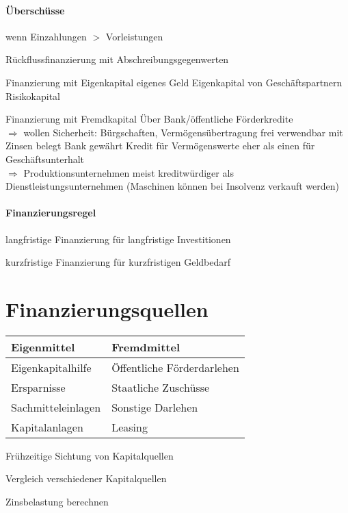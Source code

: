 \paragraph{Überschüsse}
wenn Einzahlungen $>$ Vorleistungen

\begin{compactitem}
	\item Rückflussfinanzierung
	\subitem mit Abschreibungsgegenwerten
	\item Finanzierung mit Eigenkapital
	\subitem eigenes Geld
	\subitem Eigenkapital von Geschäftspartnern
	\subitem Risikokapital
	\item Finanzierung mit Fremdkapital
	\subitem Über Bank/öffentliche Förderkredite\\
	$\Rightarrow$ wollen Sicherheit: Bürgschaften, Vermögensübertragung
	\subitem frei verwendbar
	\subitem mit Zinsen belegt
	\subitem Bank gewährt Kredit für Vermögenswerte eher als einen für Geschäftsunterhalt\\
	$\Rightarrow$ Produktionsunternehmen meist kreditwürdiger als Dienstleistungsunternehmen (Maschinen können bei Insolvenz verkauft werden)
\end{compactitem}

\paragraph{Finanzierungsregel}
\begin{compactitem}
	\item langfristige Finanzierung für langfristige Investitionen
	\item kurzfristige Finanzierung für kurzfristigen Geldbedarf
\end{compactitem}

\clearpage
\section{Finanzierungsquellen}
\begin{tabular}{l|l}
	{\bf Eigenmittel} & {\bf Fremdmittel}\\\hline
	Eigenkapitalhilfe & Öffentliche Förderdarlehen\\
	Ersparnisse & Staatliche Zuschüsse\\
	Sachmitteleinlagen & Sonstige Darlehen\\
	Kapitalanlagen & Leasing\\
\end{tabular}
\begin{compactitem}
	\item Frühzeitige Sichtung von Kapitalquellen
	\item Vergleich verschiedener Kapitalquellen
	\item Zinsbelastung berechnen
\end{compactitem}

